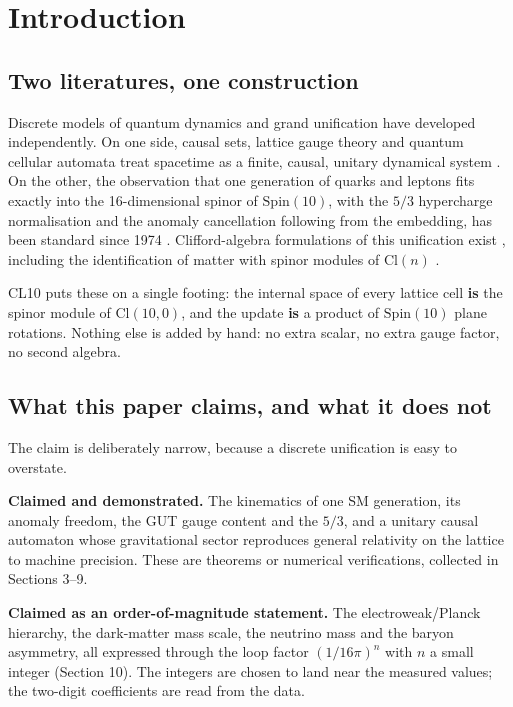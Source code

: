\documentclass[aps,prd,amsmath,amssymb,superscriptaddress,longbibliography,floatfix,preprint]{revtex4-2}
\begin{document}
\maketitle

\section{Introduction}

\subsection{Two literatures, one construction}

Discrete models of quantum dynamics and grand unification have developed independently. On one side, causal sets, lattice gauge theory and quantum cellular automata treat spacetime as a finite, causal, unitary dynamical system \cite{ref01,ref02,ref03,ref04,ref05}. On the other, the observation that one generation of quarks and leptons fits exactly into the 16-dimensional spinor of $\mathrm{Spin}(10)$, with the $5/3$ hypercharge normalisation and the anomaly cancellation following from the embedding, has been standard since 1974 \cite{ref06,ref07,ref08,ref09}. Clifford-algebra formulations of this unification exist \cite{ref10,ref11,ref12}, including the identification of matter with spinor modules of $\mathrm{Cl}(n)$ \cite{ref12}.

CL10 puts these on a single footing: the internal space of every lattice cell \textbf{is} the spinor module of $\mathrm{Cl}(10,\allowbreak{}0)$, and the update \textbf{is} a product of $\mathrm{Spin}(10)$ plane rotations. Nothing else is added by hand: no extra scalar, no extra gauge factor, no second algebra.

\subsection{What this paper claims, and what it does not}

The claim is deliberately narrow, because a discrete unification is easy to overstate.

\textbf{Claimed and demonstrated.} The kinematics of one SM generation, its anomaly freedom, the GUT gauge content and the $5/3$, and a unitary causal automaton whose gravitational sector reproduces general relativity on the lattice to machine precision. These are theorems or numerical verifications, collected in Sections 3--9.

\textbf{Claimed as an order-of-magnitude statement.} The electroweak/Planck hierarchy, the dark-matter mass scale, the neutrino mass and the baryon asymmetry, all expressed through the loop factor $(1/16\pi)^{n}$ with $n$ a small integer (Section 10). The integers are chosen to land near the measured values; the two-digit coefficients are read from the data.
\end{document}
